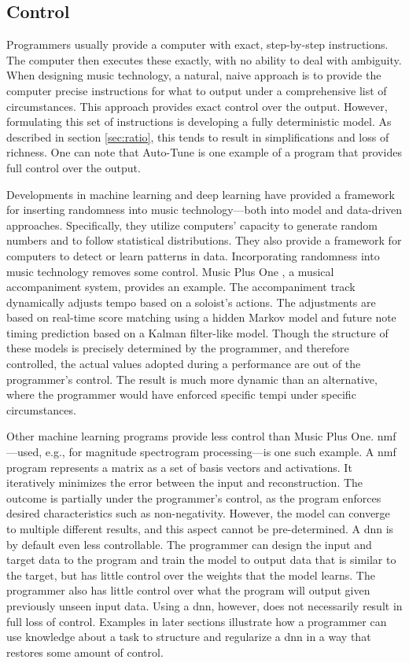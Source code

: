 \subsection{Control}
Programmers usually provide a computer with exact, step-by-step instructions. The computer then executes these exactly, with no ability to deal with ambiguity. When designing music technology, a natural, naive approach is to provide the computer precise instructions for what to output under a comprehensive list of circumstances. This approach provides exact control over the output. However, formulating this set of instructions is developing a fully deterministic model. As described in section \ref{sec:ratio}, this tends to result in simplifications and loss of richness. One can note that Auto-Tune is one example of a program that provides full control over the output.

Developments in machine learning and deep learning have provided a framework for inserting randomness into music technology---both into model and data-driven approaches. Specifically, they utilize computers' capacity to generate random numbers and to follow statistical distributions. They also provide a framework for computers to detect or learn patterns in data. Incorporating randomness into music technology removes some control. Music Plus One \cite{raphael2010music}, a musical accompaniment system, provides an example. The accompaniment track dynamically adjusts tempo based on a soloist's actions. The adjustments are based on real-time score matching using a hidden Markov model and future note timing prediction based on a Kalman filter-like model. Though the structure of these models is precisely determined by the programmer, and therefore controlled, the actual values adopted during a performance are out of the programmer's control. The result is much more dynamic than an alternative, where the programmer would have enforced specific tempi under specific circumstances. 

Other machine learning programs provide less control than Music Plus One. \gls{nmf} \cite{LeeDD2000nips}---used, e.g., for magnitude spectrogram processing---is one such example. A \gls{nmf} program represents a matrix as a set of basis vectors and activations. It iteratively minimizes the error between the input and reconstruction. The outcome is partially under the programmer's control, as the program enforces desired characteristics such as non-negativity. However, the model can converge to multiple different results, and this aspect cannot be pre-determined. A \gls{dnn} is by default even less controllable. The programmer can design the input and target data to the program and train the model to output data that is similar to the target, but has little control over the weights that the model learns. The programmer also has little control over what the program will output given previously unseen input data. Using a \gls{dnn}, however, does not necessarily result in full loss of control. Examples in later sections illustrate how a programmer can use knowledge about a task to structure and regularize a \gls{dnn} in a way that restores some amount of control. 

